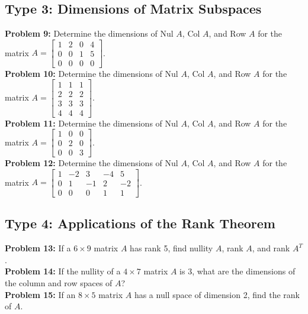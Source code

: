 \documentclass{article}
\begin{document}
\subsection*{Type 3: Dimensions of Matrix Subspaces}
\textbf{Problem 9:} Determine the dimensions of Nul $A$, Col $A$, and Row $A$ for the matrix $A = \begin{bmatrix} 1 & 2 & 0 & 4 \\ 0 & 0 & 1 & 5 \\ 0 & 0 & 0 & 0 \end{bmatrix}$. \\

\textbf{Problem 10:} Determine the dimensions of Nul $A$, Col $A$, and Row $A$ for the matrix $A = \begin{bmatrix} 1 & 1 & 1 \\ 2 & 2 & 2 \\ 3 & 3 & 3 \\ 4 & 4 & 4 \end{bmatrix}$. \\

\textbf{Problem 11:} Determine the dimensions of Nul $A$, Col $A$, and Row $A$ for the matrix $A = \begin{bmatrix} 1 & 0 & 0 \\ 0 & 2 & 0 \\ 0 & 0 & 3 \end{bmatrix}$. \\

\textbf{Problem 12:} Determine the dimensions of Nul $A$, Col $A$, and Row $A$ for the matrix $A = \begin{bmatrix} 1 & -2 & 3 & -4 & 5 \\ 0 & 1 & -1 & 2 & -2 \\ 0 & 0 & 0 & 1 & 1 \end{bmatrix}$. \\

\subsection*{Type 4: Applications of the Rank Theorem}
\textbf{Problem 13:} If a $6 \times 9$ matrix $A$ has rank 5, find nullity $A$, rank $A$, and rank $A^T$. \\

\textbf{Problem 14:} If the nullity of a $4 \times 7$ matrix $A$ is 3, what are the dimensions of the column and row spaces of $A$? \\

\textbf{Problem 15:} If an $8 \times 5$ matrix $A$ has a null space of dimension 2, find the rank of $A$. \\
\end{document}

